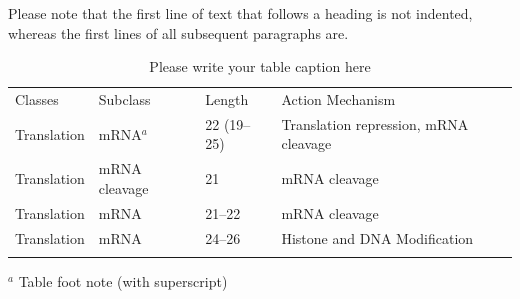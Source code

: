 Please note that the first line of text that follows a heading is not indented, whereas the first lines of all subsequent paragraphs are.


%
\begin{table}
\caption{Please write your table caption here}
\label{tab:A1}       %
%
%
\begin{tabular}{p{2cm}p{2.4cm}p{2cm}p{4.9cm}}
\hline\noalign{\smallskip}
Classes & Subclass & Length & Action Mechanism  \\
\noalign{\smallskip}\hline\noalign{\smallskip}
Translation & mRNA$^a$  & 22 (19--25) & Translation repression, mRNA cleavage\\
Translation & mRNA cleavage & 21 & mRNA cleavage\\
Translation & mRNA  & 21--22 & mRNA cleavage\\
Translation & mRNA  & 24--26 & Histone and DNA Modification\\
\noalign{\smallskip}\hline\noalign{\smallskip}
\end{tabular}

$^a$ Table foot note (with superscript)
\end{table}
%
